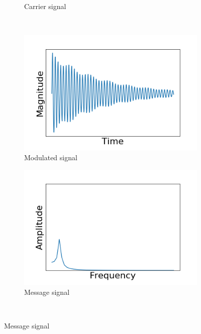 \documentclass[]{article}
\begin{document}
\begin{figure}[h!]
\begin{subfigure}[b]{0.3\textwidth}
		\caption{Carrier signal}
		\label{fig:ssb_carrier_signal}
	\end{subfigure}
	~ %
	\begin{subfigure}[b]{0.3\textwidth}
		\includegraphics[width=\textwidth]{figs/amplitude_modulation/ssb/modulated_signal.png}
		\caption{Modulated signal}
		\label{fig:ssb_modulated_signal}
	\end{subfigure}
	\begin{subfigure}[b]{0.3\textwidth}
		\includegraphics[width=\textwidth]{figs/amplitude_modulation/ssb/message_signal_freq.png}
		\caption{Message signal}
		\label{fig:ssb_message_signal_freq}
	\end{subfigure}
	~ %

\end{figure}
\end{document}

